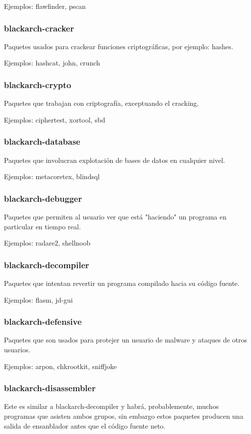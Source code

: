 \documentclass[a4paper, oneside, 11pt]{book}
\begin{document}
Ejemplos: flawfinder, pscan

\subsubsection{blackarch-cracker}
Paquetes usados para crackear funciones criptográficas, por ejemplo: hashes.

Ejemplos: hashcat, john, crunch

\subsubsection{blackarch-crypto}
Paquetes que trabajan con criptografía, exceptuando el cracking.

Ejemplos: ciphertest, xortool, sbd

\subsubsection{blackarch-database}
Paquetes que involucran explotación de bases de datos en cualquier nivel.

Ejemplos: metacoretex, blindsql

\subsubsection{blackarch-debugger}
Paquetes que permiten al usuario ver que está "haciendo" un programa en particular en tiempo real.

Ejemplos: radare2, shellnoob

\subsubsection{blackarch-decompiler}
Paquetes que intentan revertir un programa compilado hacia su código fuente.

Ejemplos: flasm, jd-gui

\subsubsection{blackarch-defensive}
Paquetes que son usados para protejer un usuario de malware y ataques de otros usuarios.

Ejemplos: arpon, chkrootkit, sniffjoke

\subsubsection{blackarch-disassembler}
Este es similar a blackarch-decompiler y habrá, probablemente, muchos
programas que asisten ambos grupos, sin embargo estos paquetes producen una salida
de ensanblador antes que el código fuente neto.
\end{document}
